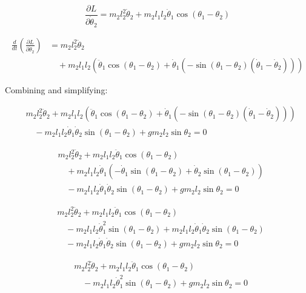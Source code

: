 \documentclass[11pt,a4paper]{article}
\begin{document}
\[ \frac{\partial L}{\partial \dot{\theta}_2} = m_2 l_2^2 \dot{\theta}_2 + m_2 l_1 l_2 \dot{\theta}_1 \cos(\theta_1 - \theta_2) \]

\begin{align*}
\frac{d}{dt} \left( \frac{\partial L}{\partial \dot{\theta}_2} \right)
  &= m_2 l_2^2 \ddot{\theta}_2 \\
  &\quad + m_2 l_1 l_2 \left( \ddot{\theta}_1 \cos(\theta_1 - \theta_2) + \dot{\theta}_1 (-\sin(\theta_1 - \theta_2) (\dot{\theta}_1 - \dot{\theta}_2)) \right)
\end{align*}

Combining and simplifying:

\begin{align*}
& m_2 l_2^2 \ddot{\theta}_2 + m_2 l_1 l_2 \left( \ddot{\theta}_1 \cos(\theta_1 - \theta_2) + \dot{\theta}_1 (-\sin(\theta_1 - \theta_2) (\dot{\theta}_1 - \dot{\theta}_2)) \right) \\
&\quad - m_2 l_1 l_2 \dot{\theta}_1 \dot{\theta}_2 \sin(\theta_1 - \theta_2) + g m_2 l_2 \sin\theta_2 = 0
\end{align*}

\begin{align*}
& m_2 l_2^2 \ddot{\theta}_2 + m_2 l_1 l_2 \ddot{\theta}_1 \cos(\theta_1 - \theta_2) \\
&\quad + m_2 l_1 l_2 \dot{\theta}_1 \left( -\dot{\theta}_1 \sin(\theta_1 - \theta_2) + \dot{\theta}_2 \sin(\theta_1 - \theta_2) \right) \\
&\quad - m_2 l_1 l_2 \dot{\theta}_1 \dot{\theta}_2 \sin(\theta_1 - \theta_2) + g m_2 l_2 \sin\theta_2 = 0
\end{align*}

\begin{align*}
& m_2 l_2^2 \ddot{\theta}_2 + m_2 l_1 l_2 \ddot{\theta}_1 \cos(\theta_1 - \theta_2) \\
&\quad - m_2 l_1 l_2 \dot{\theta}_1^2 \sin(\theta_1 - \theta_2) + m_2 l_1 l_2 \dot{\theta}_1 \dot{\theta}_2 \sin(\theta_1 - \theta_2) \\
&\quad - m_2 l_1 l_2 \dot{\theta}_1 \dot{\theta}_2 \sin(\theta_1 - \theta_2) + g m_2 l_2 \sin\theta_2 = 0
\end{align*}

\begin{align*}
& m_2 l_2^2 \ddot{\theta}_2 + m_2 l_1 l_2 \ddot{\theta}_1 \cos(\theta_1 - \theta_2) \\
&\quad - m_2 l_1 l_2 \dot{\theta}_1^2 \sin(\theta_1 - \theta_2) + g m_2 l_2 \sin\theta_2 = 0
\end{align*}
\end{document}
